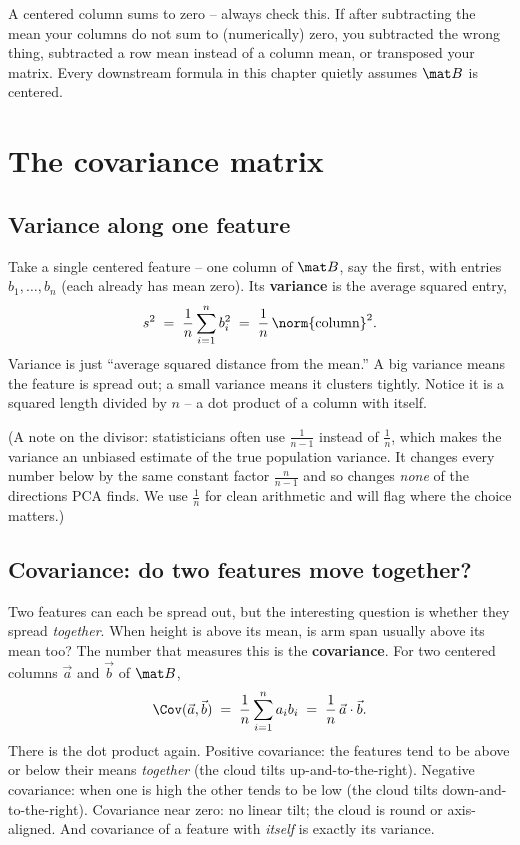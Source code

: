 \begin{trapbox}
A centered column sums to zero -- always check this. If after subtracting the mean
your columns do not sum to (numerically) zero, you subtracted the wrong thing,
subtracted a row mean instead of a column mean, or transposed your matrix. Every
downstream formula in this chapter quietly assumes $\mat B$ is centered.
\end{trapbox}

\section{The covariance matrix}

\subsection{Variance along one feature}

Take a single centered feature -- one column of $\mat B$, say the first, with
entries $b_1,\dots,b_n$ (each already has mean zero). Its \textbf{variance} is the
average squared entry,
\[
  s^2 \;=\; \frac{1}{n}\sum_{i=1}^{n} b_i^2
  \;=\; \frac{1}{n}\,\norm{\text{column}}^2.
\]
Variance is just ``average squared distance from the mean.'' A big variance means
the feature is spread out; a small variance means it clusters tightly. Notice it is
a squared length divided by $n$ -- a dot product of a column with itself.

(A note on the divisor: statisticians often use $\tfrac{1}{n-1}$ instead of
$\tfrac1n$, which makes the variance an unbiased estimate of the true population
variance. It changes every number below by the same constant factor $\tfrac{n}{n-1}$
and so changes \emph{none} of the directions PCA finds. We use $\tfrac1n$ for clean
arithmetic and will flag where the choice matters.)

\subsection{Covariance: do two features move together?}

Two features can each be spread out, but the interesting question is whether they
spread \emph{together}. When height is above its mean, is arm span usually above
its mean too? The number that measures this is the \textbf{covariance}. For two
centered columns $\vec a$ and $\vec b$ of $\mat B$,
\[
  \Cov(\vec a,\vec b) \;=\; \frac{1}{n}\sum_{i=1}^n a_i b_i
  \;=\; \frac{1}{n}\,\vec a\cdot\vec b.
\]
There is the dot product again. Positive covariance: the features tend to be above
or below their means \emph{together} (the cloud tilts up-and-to-the-right).
Negative covariance: when one is high the other tends to be low (the cloud tilts
down-and-to-the-right). Covariance near zero: no linear tilt; the cloud is round or
axis-aligned. And covariance of a feature with \emph{itself} is exactly its
variance.

